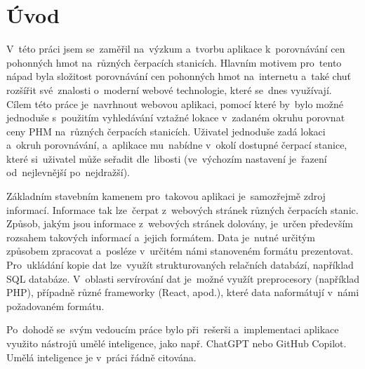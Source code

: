 \chapter{Úvod}
\label{ch:Introduction}

V~této práci jsem se~zaměřil na~výzkum a~tvorbu aplikace k~porovnávání cen
pohonných hmot na~různých čerpacích stanicích. Hlavním motivem pro~tento
nápad byla složitost porovnávání cen pohonných hmot na~internetu a~také chuť
rozšířit své~znalosti o~moderní webové technologie, které se~dnes využívají.
Cílem této práce je~navrhnout webovou aplikaci, pomocí které by~bylo možné
jednoduše s~použitím vyhledávání vztažné lokace v~zadaném okruhu porovnat
ceny PHM na~různých čerpacích stanicích. Uživatel jednoduše zadá lokaci
a~okruh porovnávání, a~aplikace mu~nabídne v~okolí dostupné čerpací stanice,
které si~uživatel může seřadit dle~libosti (ve~výchozím nastavení je~řazení
od~nejlevnější po~nejdražší).

Základním stavebním kamenem pro~takovou aplikaci je~samozřejmě zdroj
informací. Informace tak lze~čerpat z~webových stránek různých čerpacích
stanic. Způsob, jakým jsou informace z~webových stránek dolovány, je~určen
především rozsahem takových informací a~jejich formátem. Data je~nutné
určitým způsobem zpracovat a~posléze v~určitém námi stanoveném formátu
prezentovat. Pro~ukládání kopie dat lze~využít strukturovaných relačních
databází, například SQL databáze. V~oblasti servírování dat je~možné využít
preprocesory (například PHP), případně různé frameworky (React, apod.),
které data naformátují v~námi požadovaném formátu.

Po~dohodě se~svým vedoucím práce bylo při~rešerši a~implementaci aplikace
využito nástrojů umělé inteligence, jako např. ChatGPT nebo GitHub Copilot.
Umělá inteligence je v~práci řádně citována.

\endinput
